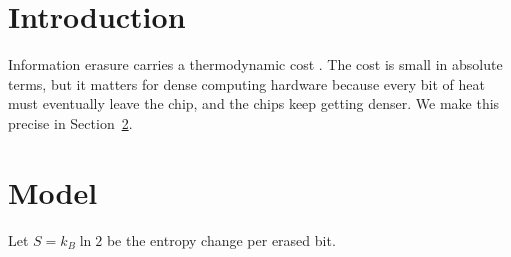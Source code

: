\documentclass{article}
\begin{document}
\section{Introduction}\label{sec:intro}
Information erasure carries a thermodynamic cost \cite{landauer1961}. The cost is small in absolute terms, but it matters for dense computing hardware because every bit of heat must eventually leave the chip, and the chips keep getting denser. We make this precise in Section~\ref{sec:model}.
\section{Model}\label{sec:model}
Let $S = k_B \ln 2$ be the entropy change per erased bit.
\end{document}
